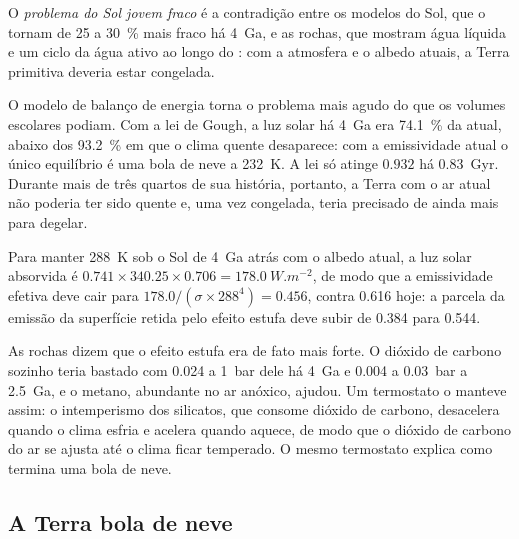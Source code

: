 \begin{definition}\label{def:b2:precambrian-earth:faint-sun}
O \emph{problema do Sol jovem fraco} é a contradição entre
os modelos do Sol, que o tornam de 25 a \qty{30}{\percent} mais fraco há \qty{4}{Ga}, e as
rochas, que mostram água líquida e um ciclo da água ativo ao longo do : com a atmosfera e o
albedo atuais, a Terra primitiva deveria estar congelada.
\end{definition}

O modelo de balanço de energia torna o problema mais agudo do que os volumes escolares podiam. Com a lei de
Gough, a luz solar há \qty{4}{Ga} era \qty{74.1}{\percent} da atual, abaixo dos
\qty{93.2}{\percent} em que o clima quente desaparece: com a emissividade atual o único
equilíbrio é uma bola de neve a \qty{232}{K}. A lei só atinge $0.932$ há
\qty{0.83}{Gyr}. Durante mais de três quartos de sua história, portanto, a Terra com
o ar atual não poderia ter sido quente e, uma vez congelada, teria precisado de ainda mais para degelar.

\begin{example}\label{ex:b2:precambrian-earth:young-greenhouse}
Para manter \qty{288}{K} sob o Sol de \qty{4}{Ga} atrás com o albedo atual, a luz solar
absorvida é $0.741\times340.25\times0.706 = \qty{178.0}{W.m^{-2}}$, de modo que a emissividade efetiva
deve cair para $178.0/(\sigma\times288^4) = 0.456$, contra 0.616 hoje: a parcela da
emissão da superfície retida pelo efeito estufa deve subir de 0.384 para 0.544.
\end{example}

As rochas dizem que o efeito estufa era de fato mais forte. O dióxido de carbono sozinho teria bastado com
0.024 a \qty{1}{bar} dele há \qty{4}{Ga} e 0.004 a \qty{0.03}{bar} a \qty{2.5}{Ga}, e o
metano, abundante no ar anóxico, ajudou. Um termostato o manteve assim: o intemperismo dos silicatos,
que consome dióxido de carbono, desacelera quando o clima esfria e acelera quando aquece, de modo que o
dióxido de carbono do ar se ajusta até o clima ficar temperado. O mesmo termostato explica
como termina uma bola de neve.

\subsection*{A Terra bola de neve}

